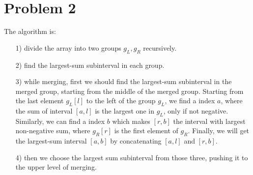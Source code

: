 \documentclass[letter,12pt]{article}
\begin{document}
\section*{Problem 2}
The algorithm is:
\begin{itemize}
    \item[1)] divide the array into two groups $g_L, g_R$ recursively.
    \item[2)] find the largest-sum subinterval in each group.
    \item[3)] while merging, first we should find the largest-sum 
    subinterval in the merged group, starting from the middle of the 
    merged group. Starting from the last element $g_L[l]$ to the left of the   
    group $g_L$, we find a index $a$, where the sum of interval $[a, l]$ is 
    the largest one in $g_L$, only if not negative. Similarly, we can find a 
    index $b$ which makes $[r, b]$ the interval with largest non-negative 
    sum, where $g_R[r]$ is the first element of $g_R$. Finally, we will get 
    the largest-sum interval $[a,b]$ by concatenating $[a, l]$ and $[r, b]$.
    \item[4)] then we choose the largest sum subinterval from those three, 
    pushing it to the upper level of merging.
\end{itemize}
\end{document}
